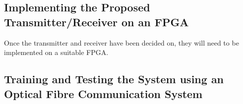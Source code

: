 \subsection{Implementing the Proposed Transmitter/Receiver on an FPGA}

Once the transmitter and receiver have been decided on, they will need to be implemented on a suitable FPGA. 

\subsection{Training and Testing the System using an Optical Fibre Communication System}
